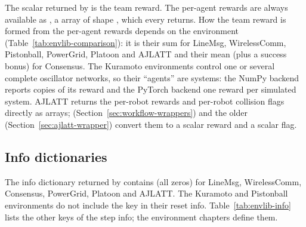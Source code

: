 The scalar  returned by  is the team reward. The
per-agent rewards are always available as , a
 array of shape , which every 
returns. How the team reward is formed from the per-agent rewards depends on the
environment (Table~\ref{tab:envlib-comparison}): it is their sum for LineMsg,
WirelessComm, Pistonball, PowerGrid, Platoon and AJLATT and their mean (plus a
success bonus) for Consensus. The Kuramoto environments control one or several
complete oscillator networks, so their ``agents'' are systems: the NumPy
backend reports  copies of its reward and the PyTorch backend
one reward per simulated system. AJLATT returns the per-robot rewards and
per-robot collision flags directly as arrays; 
(Section~\ref{sec:workflow-wrappers}) and the older 
(Section~\ref{sec:ajlatt-wrapper}) convert them to a scalar reward and a scalar
 flag.

\subsection{Info dictionaries}\label{sec:envlib-info}

The info dictionary returned by  contains
 (all zeros) for LineMsg, WirelessComm, Consensus,
PowerGrid, Platoon and AJLATT. The Kuramoto and Pistonball environments do not
include the key in their reset info. Table~\ref{tab:envlib-info} lists the
other keys of the step info; the environment chapters define them.

